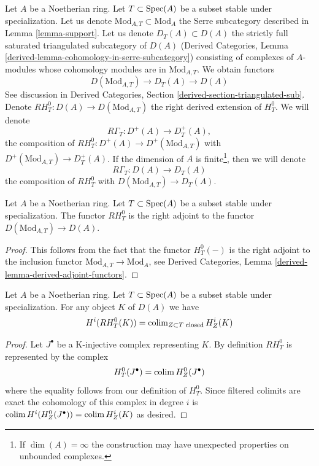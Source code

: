 \noindent
Let $A$ be a Noetherian ring. Let $T \subset \mathop{\mathrm{Spec}}(A)$ be a subset stable
under specialization. Let us denote $\text{Mod}_{A, T} \subset \text{Mod}_A$
the Serre subcategory described in Lemma \ref{lemma-support}.
Let us denote $D_T(A) \subset D(A)$ the
strictly full saturated triangulated subcategory of $D(A)$
(Derived Categories, Lemma \ref{derived-lemma-cohomology-in-serre-subcategory})
consisting of complexes of $A$-modules whose cohomology modules
are in $\text{Mod}_{A, T}$. We obtain functors
$$
D(\text{Mod}_{A, T}) \to D_T(A) \to D(A)
$$
See discussion in
Derived Categories, Section \ref{derived-section-triangulated-sub}.
Denote $RH^0_T : D(A) \to D(\text{Mod}_{A, T})$ the right
derived extension of $H^0_T$. We will denote
$$
R\Gamma_T : D^+(A) \to D^+_T(A),
$$
the composition of $RH^0_T : D^+(A) \to D^+(\text{Mod}_{A, T})$ with
$D^+(\text{Mod}_{A, T}) \to D^+_T(A)$. If the dimension of $A$ is
finite\footnote{If $\dim(A) = \infty$ the construction
may have unexpected properties on unbounded complexes.},
then we will denote
$$
R\Gamma_T : D(A) \to D_T(A)
$$
the composition of $RH^0_T$ with
$D(\text{Mod}_{A, T}) \to D_T(A)$.

\begin{lemma}
\label{lemma-adjoint}
Let $A$ be a Noetherian ring. Let $T \subset \mathop{\mathrm{Spec}}(A)$
be a subset stable under specialization. The functor
$RH^0_T$ is the right adjoint to the functor
$D(\text{Mod}_{A, T}) \to D(A)$.
\end{lemma}

\begin{proof}
This follows from the fact that the functor $H^0_T(-)$ is
the right adjoint to the inclusion functor
$\text{Mod}_{A, T} \to \text{Mod}_A$, see
Derived Categories, Lemma \ref{derived-lemma-derived-adjoint-functors}.
\end{proof}

\begin{lemma}
\label{lemma-adjoint-ext}
Let $A$ be a Noetherian ring. Let $T \subset \mathop{\mathrm{Spec}}(A)$
be a subset stable under specialization.
For any object $K$ of $D(A)$ we have
$$
H^i(RH^0_T(K)) = \mathop{\mathrm{colim}}\nolimits_{Z \subset T\text{ closed}} H^i_Z(K)
$$
\end{lemma}

\begin{proof}
Let $J^\bullet$ be a K-injective complex representing $K$.
By definition $RH^0_T$ is represented by the complex
$$
H^0_T(J^\bullet) = \mathop{\mathrm{colim}}\nolimits H^0_Z(J^\bullet)
$$
where the equality follows from our definition of $H^0_T$.
Since filtered colimits are exact the cohomology of this
complex in degree $i$ is
$\mathop{\mathrm{colim}}\nolimits H^i(H^0_Z(J^\bullet)) = \mathop{\mathrm{colim}}\nolimits H^i_Z(K)$
as desired.
\end{proof}

